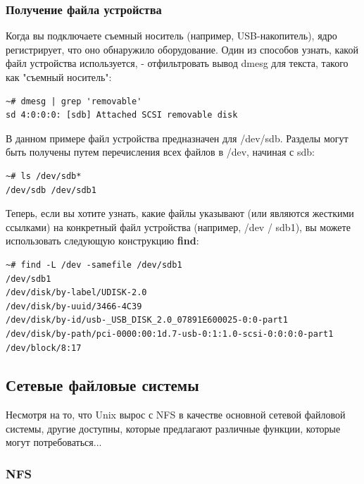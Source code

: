 \documentclass[10pt]{book}
\begin{document}
\subsubsection{Получение файла устройства}

Когда вы подключаете съемный носитель (например, USB-накопитель), ядро регистрирует, что оно обнаружило оборудование. Один из способов узнать, какой файл устройства используется, - отфильтровать вывод dmesg для текста, такого как "съемный носитель":

\begin{tcolorbox} 
\begin{lstlisting}
~# dmesg | grep 'removable'
sd 4:0:0:0: [sdb] Attached SCSI removable disk
\end{lstlisting}
\end{tcolorbox}

В данном примере файл устройства предназначен для /dev/sdb. Разделы могут быть получены путем перечисления всех файлов в /dev, начиная с sdb:

\begin{tcolorbox} 
\begin{lstlisting}
~# ls /dev/sdb*
/dev/sdb /dev/sdb1
\end{lstlisting}
\end{tcolorbox}

Теперь, если вы хотите узнать, какие файлы указывают (или являются жесткими ссылками) на конкретный файл устройства (например, /dev / sdb1), вы можете использовать следующую конструкцию \textbf{find}:

\begin{tcolorbox} 
\begin{lstlisting}
~# find -L /dev -samefile /dev/sdb1
/dev/sdb1
/dev/disk/by-label/UDISK-2.0
/dev/disk/by-uuid/3466-4C39
/dev/disk/by-id/usb-_USB_DISK_2.0_07891E600025-0:0-part1
/dev/disk/by-path/pci-0000:00:1d.7-usb-0:1:1.0-scsi-0:0:0:0-part1
/dev/block/8:17
\end{lstlisting}
\end{tcolorbox}

\subsection{Сетевые файловые системы}

Несмотря на то, что Unix вырос с NFS в качестве основной сетевой файловой системы, другие доступны, которые предлагают различные функции, которые могут потребоваться...

\subsubsection{NFS}
\end{document}
